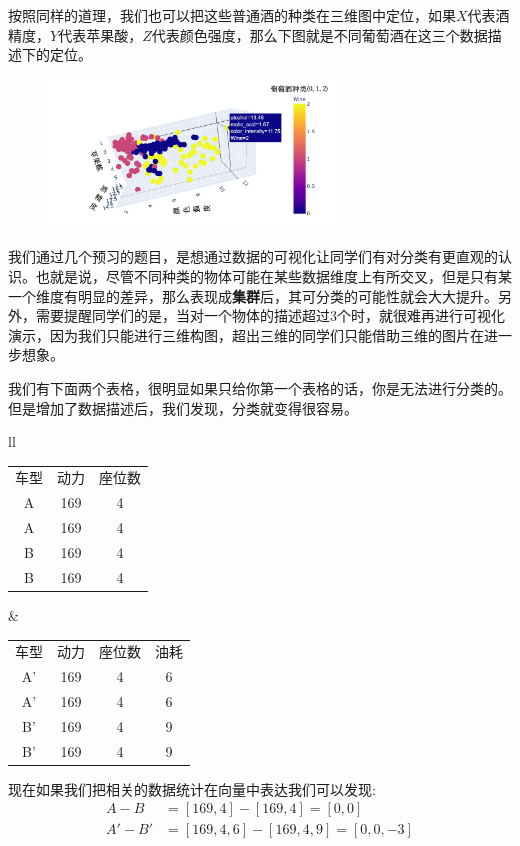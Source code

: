 \documentclass[12pt]{article}
\numberwithin{figure}{section}
\numberwithin{equation}{section}
\newenvironment{question}[2][Question]{\begin{trivlist}
\item[\hskip \labelsep {\bfseries #1}\hskip \labelsep {\bfseries #2.}]}{\end{trivlist}}
\begin{document}
按照同样的道理，我们也可以把这些普通酒的种类在三维图中定位，如果$X$代表酒精度，$Y$代表苹果酸，$Z$代表颜色强度，那么下图就是不同葡萄酒在这三个数据描述下的定位。
	\begin{figure}[H]
		\centering
		\includegraphics[width=0.69\textwidth]{fig/C2C1wine}
	\end{figure}

\begin{tcolorbox}[title=为什么要将数据可视化]
		我们通过几个预习的题目，是想通过数据的可视化让同学们有对分类有更直观的认识。也就是说，尽管不同种类的物体可能在某些数据维度上有所交叉，但是只有某一个维度有明显的差异，那么表现成\textbf{集群}后，其可分类的可能性就会大大提升。另外，需要提醒同学们的是，当对一个物体的描述超过3个时，就很难再进行可视化演示，因为我们只能进行三维构图，超出三维的同学们只能借助三维的图片在进一步想象。
\end{tcolorbox}

\begin{question}{C1-Q4}
		我们有下面两个表格，很明显如果只给你第一个表格的话，你是无法进行分类的。但是增加了数据描述后，我们发现，分类就变得很容易。
\end{question}
\begin{table}[H]
	\centering
		\begin{tabular}{ll}
\begin{tabular}{ccc}
车型 & 动力 & 座位数  \\
\cline{1-3}
A & 169 & 4 \\
A & 169 & 4 \\
B & 169 & 4\\
B &  169 & 4  \\
\hline 
\end{tabular}
&
\begin{tabular}{cccc}
车型 & 动力 & 座位数 & 油耗 \\
\cline{1-4}
A' & 169 & 4 & 6\\
A' & 169 & 4 & 6 \\
B' & 169 & 4 & 9 \\
B' &  169 & 4 & 9 \\
\hline 
\end{tabular}
\end{tabular}
\end{table}
现在如果我们把相关的数据统计在向量中表达我们可以发现:
\begin{align*}
	A - B & = [169, 4] - [169, 4] = [0, 0]  \\
	A' - B' & = [169, 4, 6] - [169, 4, 9] = [0, 0, -3] 
\end{align*}
\end{document}
